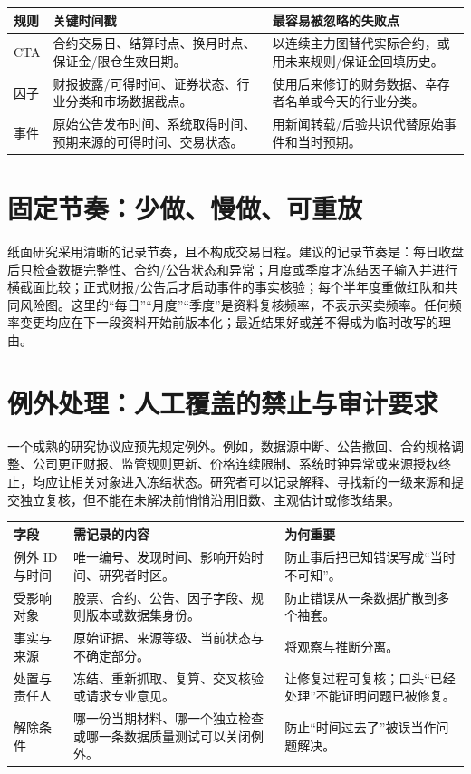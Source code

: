 \begin{dashboardbox}[最低数据合同]
\begin{tabularx}{\textwidth}{L{2.1cm}X X}
\toprule
\textbf{规则} & \textbf{关键时间戳} & \textbf{最容易被忽略的失败点} \\
\midrule
CTA & 合约交易日、结算时点、换月时点、保证金/限仓生效日期。 & 以连续主力图替代实际合约，或用未来规则/保证金回填历史。 \\
因子 & 财报披露/可得时间、证券状态、行业分类和市场数据截点。 & 使用后来修订的财务数据、幸存者名单或今天的行业分类。 \\
事件 & 原始公告发布时间、系统取得时间、预期来源的可得时间、交易状态。 & 用新闻转载/后验共识代替原始事件和当时预期。 \\
\bottomrule
\end{tabularx}
\end{dashboardbox}

\section{固定节奏：少做、慢做、可重放}

纸面研究采用清晰的记录节奏，且不构成交易日程。建议的记录节奏是：每日收盘后只检查数据完整性、合约/公告状态和异常；月度或季度才冻结因子输入并进行横截面比较；正式财报/公告后才启动事件的事实核验；每个半年度重做红队和共同风险图。这里的“每日”“月度”“季度”是资料复核频率，不表示买卖频率。任何频率变更均应在下一段资料开始前版本化；最近结果好或差不得成为临时改写的理由。

\section{例外处理：人工覆盖的禁止与审计要求}

一个成熟的研究协议应预先规定例外。例如，数据源中断、公告撤回、合约规格调整、公司更正财报、监管规则更新、价格连续限制、系统时钟异常或来源授权终止，均应让相关对象进入冻结状态。研究者可以记录解释、寻找新的一级来源和提交独立复核，但不能在未解决前悄悄沿用旧数、主观估计或修改结果。

\begin{exhibitbox}
\small
\begin{tabularx}{\exhibitboxwidth}{L{2.4cm}X L{3.85cm}}
\toprule
\textbf{字段} & \textbf{需记录的内容} & \textbf{为何重要} \\
\midrule
例外 ID 与时间 & 唯一编号、发现时间、影响开始时间、研究者时区。 & 防止事后把已知错误写成“当时不可知”。 \\
受影响对象 & 股票、合约、公告、因子字段、规则版本或数据集身份。 & 防止错误从一条数据扩散到多个袖套。 \\
事实与来源 & 原始证据、来源等级、当前状态与不确定部分。 & 将观察与推断分离。 \\
处置与责任人 & 冻结、重新抓取、复算、交叉核验或请求专业意见。 & 让修复过程可复核；口头“已经处理”不能证明问题已被修复。 \\
解除条件 & 哪一份当期材料、哪一个独立检查或哪一条数据质量测试可以关闭例外。 & 防止“时间过去了”被误当作问题解决。 \\
\bottomrule
\end{tabularx}
\end{exhibitbox}


